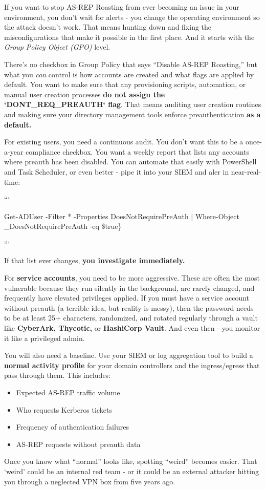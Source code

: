 If you want to stop AS-REP Roasting from ever becoming an issue in your environment, you don’t wait for alerts - you change the operating environment so the attack doesn’t work. That means hunting down and fixing the misconfigurations that make it possible in the first place. And it starts with the \textit{Group Policy Object (GPO) }level.

There’s no checkbox in Group Policy that says “Disable AS-REP Roasting,” but what you \textit{can} control is how accounts are created and what flags are applied by default. You want to make sure that any provisioning scripts, automation, or manual user creation processes \textbf{do not assign the `DONT\_REQ\_PREAUTH` flag}. That means auditing user creation routines and making sure your directory management tools enforce preauthentication \textbf{as a default.}

For existing users, you need a continuous audit. You don’t want this to be a once-a-year compliance checkbox. You want a weekly report that lists any accounts where preauth has been disabled. You can automate that easily with PowerShell and Task Scheduler, or even better - pipe it into your SIEM and aler in near-real-time:

```

Get-ADUser -Filter * -Properties DoesNotRequirePreAuth | Where-Object \_DoesNotRequirePreAuth -eq \$true\}

```

If that list ever changes, \textbf{you investigate immediately.}

For \textbf{service accounts}, you need to be more aggressive. These are often the most vulnerable because they run silently in the background, are rarely changed, and frequently have elevated privileges applied. If you must have a service account without preauth (a terrible idea, but reality is messy), then the password needs to be at least 25+ characters, randomized, and rotated regularly through a vault like \textbf{CyberArk, Thycotic, }or \textbf{HashiCorp Vault}. And even then - you monitor it like a privileged admin.

You will also need a baseline. Use your SIEM or log aggregation tool to build a \textbf{normal activity profile} for your domain controllers and the ingress/egress that pass through them. This includes:

\begin{itemize}
    \item Expected AS-REP traffic volume
    \item Who requests Kerberos tickets
    \item Frequency of authentication failures
    \item AS-REP requests without preauth data
\end{itemize}
Once you know what “normal” looks like, spotting “weird” becomes easier. That ‘weird’ could be an internal red team - or it could be an external attacker hitting you through a neglected VPN box from five years ago.

